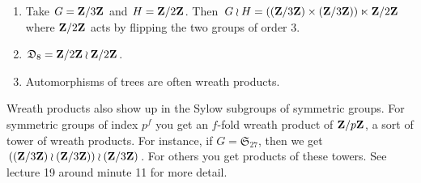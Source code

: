 \documentclass[11pt, twoside]{amsart}
\begin{document}
\begin{example}\text{}
\begin{enumerate}
\item Take $G=\mathbf{Z}/3\mathbf{Z} $ and $H = \mathbf{Z}/2\mathbf{Z} $. Then 
$
G\wr H = ((\mathbf{Z}/3\mathbf{Z} ) \times (\mathbf{Z}/3\mathbf{Z} )) \ltimes \mathbf{Z}/2\mathbf{Z} 
$ 
where $\mathbf{Z}/2\mathbf{Z} $ acts by flipping the two groups of order $3$.
\item $\mathfrak{D}_8 = \mathbf{Z}/2\mathbf{Z} \wr \mathbf{Z}/2\mathbf{Z}$.
\item Automorphisms of trees are often wreath products. 
\end{enumerate}
\end{example} %

Wreath products also show up in the Sylow subgroups of symmetric groups. For symmetric groups of index $p^f$ you get an $f$-fold wreath product of $\mathbf{Z}/p\mathbf{Z}$, a sort of tower of wreath products. For instance, if $G=\mathfrak{S}_{27}$, then we get $((\mathbf{Z}/3\mathbf{Z} )\wr (\mathbf{Z}/3\mathbf{Z})) \wr (\mathbf{Z}/3\mathbf{Z})$. For others you get products of these towers. See lecture 19 around minute 11 for more detail. %
\end{document}

